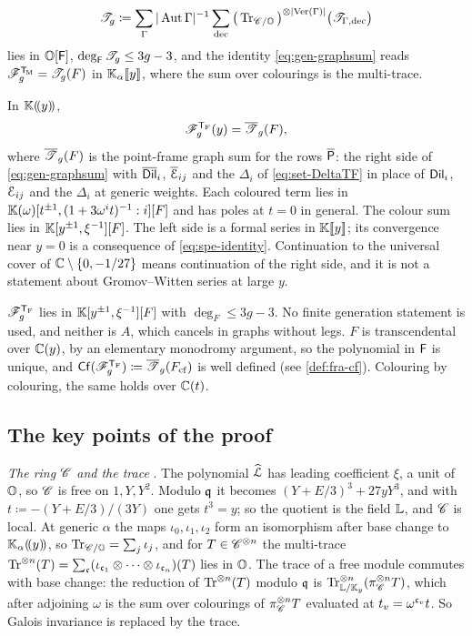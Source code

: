\begin{thm}
\begin{description}
\[
\mathscr{T}_g\coloneqq\sum_\Gamma|\operatorname{Aut}\Gamma|^{-1}\sum_{\mathrm{dec}}\big(\operatorname{Tr}_{\mathscr{C}/\mathbb{O}}\big)^{\otimes|\mathrm{Ver}(\Gamma)|}\big(\mathscr{T}_{\Gamma,\mathrm{dec}}\big)
\]
lies in $\mathbb{O}[\mathsf{F}]$, $\deg_{\mathsf{F}}\mathscr{T}_g\leq 3g-3$, and the identity \eqref{eq:gen-graphsum} reads $\mathscr{F}_g^{\mathsf{T}_{\!\mathrm{M}}}=\mathscr{T}_g(F)$ in $\mathbb{K}_{\alpha}[\![ y ]\!]$, where the sum over colourings is the multi-trace.
\item[(d) The specialisation identity] In $\mathbb{K}(\!(y)\!)$,
\begin{equation}
\label{eq:spe-identity}
\mathscr{F}_g^{\mathsf{T}_{\mathrm{F}}}(y)=\overline{\mathscr{T}}_g(F),
\end{equation}
where $\overline{\mathscr{T}}_g(F)$ is the point-frame graph sum for the rows $\overline{\mathsf{P}}$: the right side of \eqref{eq:gen-graphsum} with $\overline{\mathsf{Dil}}_i$, $\overline{\mathcal{E}}_{ij}$ and the $\Delta_i$ of \eqref{eq:set-DeltaTF} in place of $\mathsf{Dil}_i$, $\mathcal{E}_{ij}$ and the $\Delta_i$ at generic weights. Each coloured term lies in $\mathbb{K}(\omega)[t^{\pm1},(1+3\omega^it)^{-1}:i][F]$ and has poles at $t=0$ in general. The colour sum lies in $\mathbb{K}[y^{\pm1},\xi^{-1}][F]$. The left side is a formal series in $\mathbb{K}[\![ y ]\!]$; its convergence near $y=0$ is a consequence of \eqref{eq:spe-identity}. Continuation to the universal cover of $\mathbb{C}\setminus\{0,-1/27\}$ means continuation of the right side, and it is not a statement about Gromov--Witten series at large $y$.
\item[(e) Consequences] $\mathscr{F}_g^{\mathsf{T}_{\mathrm{F}}}$ lies in $\mathbb{K}[y^{\pm1},\xi^{-1}][F]$ with $\deg_F\leq 3g-3$. No finite generation statement is used, and neither is $A$, which cancels in graphs without legs. $F$ is transcendental over $\mathbb{C}(y)$, by an elementary monodromy argument, so the polynomial in $\mathsf{F}$ is unique, and $\mathsf{Cf}(\mathscr{F}_g^{\mathsf{T}_{\mathrm{F}}})\coloneqq\overline{\mathscr{T}}_g(F_{\mathrm{cf}})$ is well defined (see \cref{def:fra-cf}). Colouring by colouring, the same holds over $\mathbb{C}(t)$.
\end{description}
\end{thm}

\subsection{The key points of the proof}

\emph{The ring $\mathscr{C}$ and the trace} . The polynomial $\widehat{\mathcal{L}}$ has leading coefficient $\xi$, a unit of $\mathbb{O}$, so $\mathscr{C}$ is free on $1,Y,Y^2$. Modulo $\mathfrak{q}$ it becomes $(Y+E/3)^3+27yY^3$, and with $t\coloneqq-(Y+E/3)/(3Y)$ one gets $t^3=y$; so the quotient is the field $\mathbb{L}$, and $\mathscr{C}$ is local. At generic $\alpha$ the maps $\iota_0,\iota_1,\iota_2$ form an isomorphism after base change to $\mathbb{K}_{\alpha}(\!(y)\!)$, so $\operatorname{Tr}_{\mathscr{C}/\mathbb{O}}=\sum_j\iota_j$, and for $T\in\mathscr{C}^{\otimes n}$ the multi-trace $\operatorname{Tr}^{\otimes n}(T)=\sum_{\mathfrak{c}}(\iota_{\mathfrak{c}_1}\otimes\dots\otimes\iota_{\mathfrak{c}_n})(T)$ lies in $\mathbb{O}$. The trace of a free module commutes with base change: the reduction of $\operatorname{Tr}^{\otimes n}(T)$ modulo $\mathfrak{q}$ is $\operatorname{Tr}_{\mathbb{L}/\mathbb{K}_{y}}^{\otimes n}(\pi_{\mathscr{C}}^{\otimes n}T)$, which after adjoining $\omega$ is the sum over colourings of $\pi_{\mathscr{C}}^{\otimes n}T$ evaluated at $t_v=\omega^{\mathfrak{c}_v}t$. So Galois invariance is replaced by the trace.


